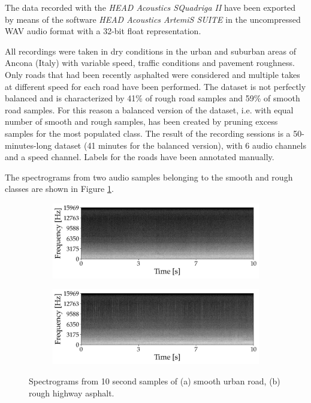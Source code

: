The data recorded with the \textit{HEAD Acoustics SQuadriga II} have been exported by means of the software \textit{HEAD Acoustics ArtemiS SUITE} in the uncompressed WAV audio format with a 32-bit float representation.

All recordings were taken in dry conditions in the urban and suburban areas of Ancona (Italy) with variable speed, traffic conditions and pavement roughness. Only roads that had been recently asphalted were considered and multiple takes at different speed for each road have been performed. The dataset is not perfectly balanced and is characterized by 41\% of rough road samples and 59\% of smooth road samples. For this reason a balanced version of the dataset, i.e. with equal number of smooth and rough samples, has been created by pruning excess samples for the most populated class. 
The result of the recording sessions is a 50-minutes-long dataset (41 minutes for the balanced version), with 6 audio channels and a speed channel. Labels for the roads have been annotated manually.

The spectrograms from two audio samples belonging to the smooth and rough classes are shown in Figure \ref{fig:spectrograms_road}.

\begin{figure}[ht]
	\centering
	\begin{subfigure}[b]{0.48\textwidth}
		\includegraphics[width=\textwidth]{img/specgram_REC007}
	\end{subfigure}
	\hfil
	\begin{subfigure}[b]{0.48\textwidth}
		\includegraphics[width=\textwidth]{img/specgram_REC015}
	\end{subfigure}
	
	
	\caption[Spectrograms from 10 second samples]{Spectrograms from 10 second samples of (a) smooth urban road, (b) rough highway asphalt.}
	\label{fig:spectrograms_road}
\end{figure}

